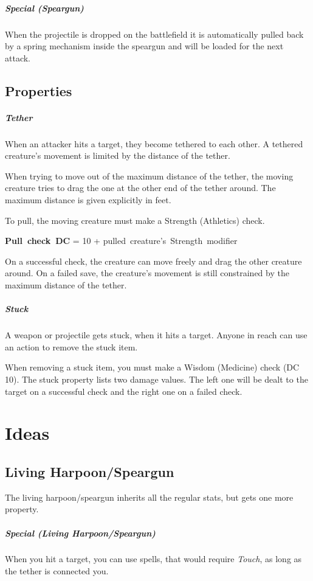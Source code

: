 \documentclass[letterpaper,twocolumn,openany,nodeprecatedcode]{dndbook}
\begin{document}
\subparagraph{Special (Speargun)}
When the projectile is dropped on the battlefield it is automatically pulled back by a spring mechanism inside the speargun and will be loaded for the next attack.

\subsection{Properties}

\subparagraph{Tether}
When an attacker hits a target, they become tethered to each other.
A tethered creature's movement is limited by the distance of the tether.

When trying to move out of the maximum distance of the tether, the moving creature tries to drag the one at the other end of the tether around.
The maximum distance is given explicitly in feet.

To pull, the moving creature must make a Strength (Athletics) check.

\begin{center}
    \mbox{\bf Pull check DC} = \mbox{10} + \mbox{pulled creature's Strength modifier}
\end{center}

On a successful check, the creature can move freely and drag the other creature around.
On a failed save, the creature's movement is still constrained by the maximum distance of the tether.

\subparagraph{Stuck}
A weapon or projectile gets stuck, when it hits a target.
Anyone in reach can use an action to remove the stuck item.

When removing a stuck item, you must make a Wisdom (Medicine) check (DC 10). 
The stuck property lists two damage values.
The left one will be dealt to the target on a successful check and the right one on a failed check.

\section{Ideas}

\subsection{Living Harpoon/Speargun}
The living harpoon/speargun inherits all the regular stats, but gets one more property.

\subparagraph{Special (Living Harpoon/Speargun)}
When you hit a target, you can use spells, that would require \emph{Touch}, as long as the tether is connected you.
\end{document}
